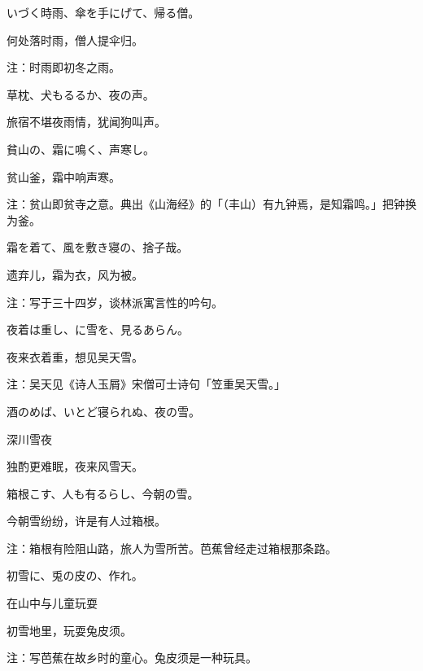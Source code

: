 \begin{haiku}
    {\FH いづく時雨、傘を手にげて、帰る僧。}

    {\FK 何处落时雨，僧人提伞归。}

    {\FT 注：时雨即初冬之雨。}
\end{haiku}

\begin{haiku}
    {\FH 草枕、犬もるるか、夜の声。}

    {\FK 旅宿不堪夜雨情，犹闻狗叫声。}
\end{haiku}

\begin{haiku}
    {\FH 貧山の、霜に鳴く、声寒し。}

    {\FK 贫山釜，霜中响声寒。}

    {\FT 注：贫山即贫寺之意。典出《山海经》的「（丰山）有九钟焉，是知霜鸣。」把钟换为釜。}
\end{haiku}

\begin{haiku}
    {\FH 霜を着て、風を敷き寝の、捨子哉。}

    {\FK 遗弃儿，霜为衣，风为被。}

    {\FT 注：写于三十四岁，谈林派寓言性的吟句。}
\end{haiku}

\begin{haiku}
    {\FH 夜着は重し、に雪を、見るあらん。}

    {\FK 夜来衣着重，想见吴天雪。}

    {\FT 注：吴天见《诗人玉屑》宋僧可士诗句「笠重吴天雪。」}
\end{haiku}

\begin{haiku}
    {\FH 酒のめば、いとど寝られぬ、夜の雪。}

    {\FK 深川雪夜}

    {\FK 独酌更难眠，夜来风雪天。}
\end{haiku}

\begin{haiku}
    {\FH 箱根こす、人も有るらし、今朝の雪。}

    {\FK 今朝雪纷纷，许是有人过箱根。}

    {\FT 注：箱根有险阻山路，旅人为雪所苦。芭蕉曾经走过箱根那条路。}
\end{haiku}

\begin{haiku}
    {\FH 初雪に、兎の皮の、作れ。}

    {\FK 在山中与儿童玩耍}

    {\FK 初雪地里，玩耍兔皮须。}

    {\FT 注：写芭蕉在故乡时的童心。兔皮须是一种玩具。}
\end{haiku}

